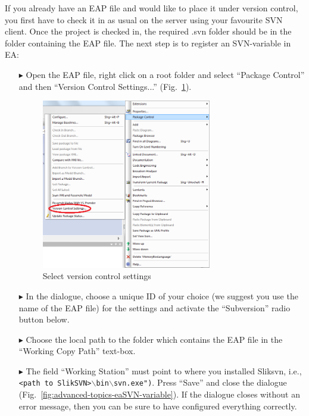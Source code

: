 If you already have an EAP file and would like to place it under version control, you first have to check it in as usual on the server using your favourite SVN
client. Once the project is checked in, the required .svn folder should be in the folder containing the EAP file. The next step is to register an SVN-variable
in EA:

\begin{enumerate}
  \item[$\blacktriangleright$] Open the EAP file, right click on a root folder and select ``Package Control'' and then ``Version Control Settings...''
  (Fig.~\ref{fig:advanced-topics-eaSVN-rightclick}).
  
\begin{figure}[!htbp]
\begin{center}
 	\includegraphics[width=0.7\textwidth]{rightclick}
	\caption{Select version control settings}
  	\label{fig:advanced-topics-eaSVN-rightclick}
\end{center}
\end{figure}

\newpage

  \item[$\blacktriangleright$] In the dialogue, choose a unique ID of your choice (we suggest you use the name of the EAP file) for the settings and activate
  the ``Subversion'' radio button below.
  \item[$\blacktriangleright$] Choose the local path to the folder which contains the EAP file in the ``Working Copy Path'' text-box.
  \item[$\blacktriangleright$] The field ``Working Station'' must point to where you installed Sliksvn, i.e., \texttt{<path to
  SlikSVN>$\backslash$bin$\backslash$svn.exe")}. Press ``Save'' and close the dialogue (Fig.~\ref{fig:advanced-topics-eaSVN-variable}). If the dialogue closes
  without an error message, then you can be sure to have configured everything correctly.


\end{enumerate}
